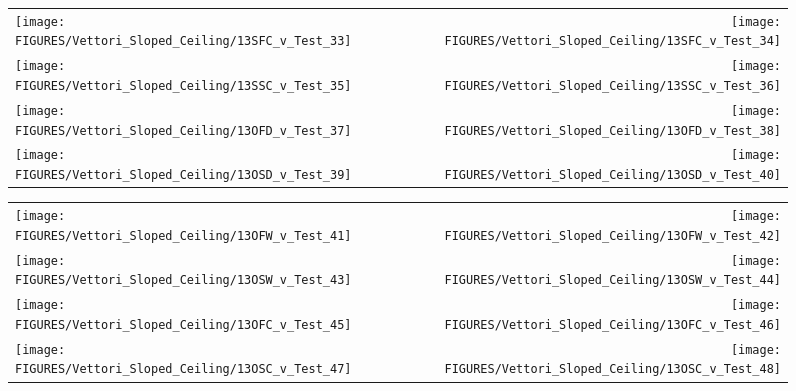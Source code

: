 \begin{figure}[p]
\begin{tabular*}{\textwidth}{l@{\extracolsep{\fill}}r}
\texttt{[image: FIGURES/Vettori\_Sloped\_Ceiling/13SFC\_v\_Test\_33]} &
\texttt{[image: FIGURES/Vettori\_Sloped\_Ceiling/13SFC\_v\_Test\_34]} \\
\texttt{[image: FIGURES/Vettori\_Sloped\_Ceiling/13SSC\_v\_Test\_35]} &
\texttt{[image: FIGURES/Vettori\_Sloped\_Ceiling/13SSC\_v\_Test\_36]} \\
\texttt{[image: FIGURES/Vettori\_Sloped\_Ceiling/13OFD\_v\_Test\_37]} &
\texttt{[image: FIGURES/Vettori\_Sloped\_Ceiling/13OFD\_v\_Test\_38]} \\
\texttt{[image: FIGURES/Vettori\_Sloped\_Ceiling/13OSD\_v\_Test\_39]} &
\texttt{[image: FIGURES/Vettori\_Sloped\_Ceiling/13OSD\_v\_Test\_40]} \\
\end{tabular*}
\label{Vettori_Sloped_5}
\end{figure}

\begin{figure}[p]
\begin{tabular*}{\textwidth}{l@{\extracolsep{\fill}}r}
\texttt{[image: FIGURES/Vettori\_Sloped\_Ceiling/13OFW\_v\_Test\_41]} &
\texttt{[image: FIGURES/Vettori\_Sloped\_Ceiling/13OFW\_v\_Test\_42]} \\
\texttt{[image: FIGURES/Vettori\_Sloped\_Ceiling/13OSW\_v\_Test\_43]} &
\texttt{[image: FIGURES/Vettori\_Sloped\_Ceiling/13OSW\_v\_Test\_44]} \\
\texttt{[image: FIGURES/Vettori\_Sloped\_Ceiling/13OFC\_v\_Test\_45]} &
\texttt{[image: FIGURES/Vettori\_Sloped\_Ceiling/13OFC\_v\_Test\_46]} \\
\texttt{[image: FIGURES/Vettori\_Sloped\_Ceiling/13OSC\_v\_Test\_47]} &
\texttt{[image: FIGURES/Vettori\_Sloped\_Ceiling/13OSC\_v\_Test\_48]} \\
\end{tabular*}
\label{Vettori_Sloped_6}
\end{figure}

